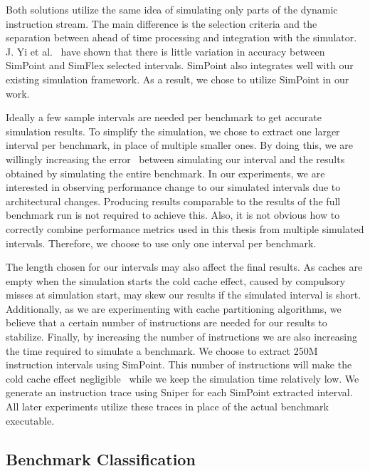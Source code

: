 Both solutions utilize the same idea of simulating only parts of the dynamic instruction stream.
The main difference is the selection criteria and the separation between ahead of time processing and integration with the simulator.
J. Yi et al.~\cite{Yi2005} have shown that there is little variation in accuracy between SimPoint and SimFlex selected intervals.
SimPoint also integrates well with our existing simulation framework.
As a result, we chose to utilize SimPoint in our work.

Ideally a few sample intervals are needed per benchmark to get accurate simulation results.
To simplify the simulation, we chose to extract one larger interval per benchmark, in place of multiple smaller ones.
By doing this, we are willingly increasing the error~\cite{Hamerly2004} between simulating our interval and the results obtained by simulating the entire benchmark.
In our experiments, we are interested in observing performance change to our simulated intervals due to architectural changes.
Producing results comparable to the results of the full benchmark run is not required to achieve this.
Also, it is not obvious how to correctly combine performance metrics used in this thesis from multiple simulated intervals.
Therefore, we choose to use only one interval per benchmark.

The length chosen for our intervals may also affect the final results.
As caches are empty when the simulation starts the cold cache effect, caused by compulsory misses at simulation start, may skew our results if the simulated interval is short.
Additionally, as we are experimenting with cache partitioning algorithms, we believe that a certain number of instructions are needed for our results to stabilize.
Finally, by increasing the number of instructions we are also increasing the time required to simulate a benchmark.
We choose to extract 250M instruction intervals using SimPoint.
This number of instructions will make the cold cache effect negligible~\cite{Hamerly2005,Hamerly2004,Olsen2014} while we keep the simulation time relatively low.
We generate an instruction trace using Sniper for each SimPoint extracted interval.
All later experiments utilize these traces in place of the actual benchmark executable.

\subsection{Benchmark Classification}
\label{sec:methodology:benchmarks:classification}


